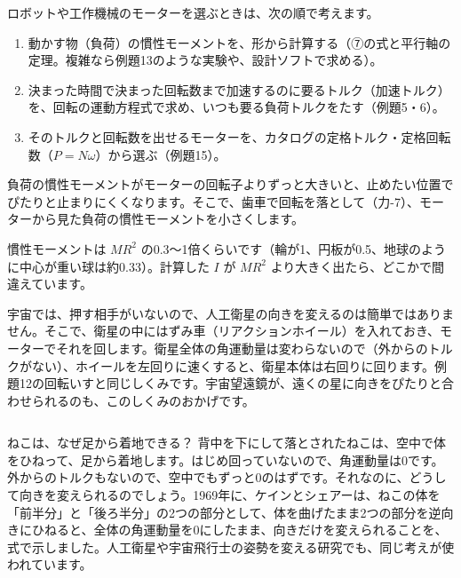 \begin{phkougaku}[モーターの選定]
\noindent ロボットや工作機械のモーターを選ぶときは、次の順で考えます。
\begin{enumerate}[label={\bkcircled{\arabic*}}, leftmargin=2.4\zw, itemsep=2pt, topsep=2pt]
\item 動かす物（負荷）の慣性モーメントを、形から計算する（⑦の式と平行軸の定理。複雑なら例題13のような実験や、設計ソフトで求める）。
\item 決まった時間で決まった回転数まで加速するのに要るトルク（加速トルク）を、回転の運動方程式で求め、いつも要る負荷トルクをたす（例題5・6）。
\item そのトルクと回転数を出せるモーターを、カタログの定格トルク・定格回転数（$P=N\omega$）から選ぶ（例題15）。
\end{enumerate}
負荷の慣性モーメントがモーターの回転子よりずっと大きいと、止めたい位置でぴたりと止まりにくくなります。そこで、歯車で回転を落として（力-7）、モーターから見た負荷の慣性モーメントを小さくします。

\begin{phketa}[回る物の大きさ]
慣性モーメントは $MR^2$ の0.3〜1倍くらいです（輪が1、円板が0.5、地球のように中心が重い球は約0.33）。計算した $I$ が $MR^2$ より大きく出たら、どこかで間違えています。
\end{phketa}

宇宙では、押す相手がいないので、人工衛星の向きを変えるのは簡単ではありません。そこで、衛星の中にはずみ車（リアクションホイール）を入れておき、モーターでそれを回します。衛星全体の角運動量は変わらないので（外からのトルクがない）、ホイールを左回りに速くすると、衛星本体は右回りに回ります。例題12の回転いすと同じしくみです。宇宙望遠鏡が、遠くの星に向きをぴたりと合わせられるのも、このしくみのおかげです。
\end{phkougaku}

\begin{column}{ねこは、なぜ足から着地できる？}
背中を下にして落とされたねこは、空中で体をひねって、足から着地します。はじめ回っていないので、角運動量は0です。外からのトルクもないので、空中でもずっと0のはずです。それなのに、どうして向きを変えられるのでしょう。1969年に、ケインとシェアーは、ねこの体を「前半分」と「後ろ半分」の2つの部分として、体を曲げたまま2つの部分を逆向きにひねると、全体の角運動量を0にしたまま、向きだけを変えられることを、式で示しました。人工衛星や宇宙飛行士の姿勢を変える研究でも、同じ考えが使われています。
\end{column}

